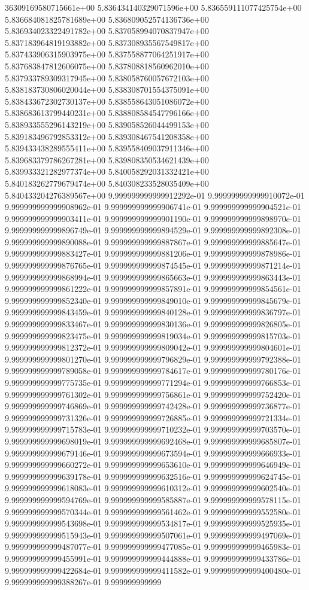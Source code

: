 36309169580715661e+00	5.836434140329071596e+00	5.836559111077425754e+00	5.836684081825781689e+00	5.836809052574136736e+00	5.836934023322491782e+00	5.837058994070837947e+00	5.837183964819193882e+00	5.837308935567549817e+00	5.837433906315903975e+00	5.837558877064251917e+00	5.837683847812606075e+00	5.837808818560962010e+00	5.837933789309317945e+00	5.838058760057672103e+00	5.838183730806020044e+00	5.838308701554375091e+00	5.838433672302730137e+00	5.838558643051086072e+00	5.838683613799440231e+00	5.838808584547796166e+00	5.838933555296143219e+00	5.839058526044499153e+00	5.839183496792853312e+00	5.839308467541208358e+00	5.839433438289555411e+00	5.839558409037911346e+00	5.839683379786267281e+00	5.839808350534621439e+00	5.839933321282977374e+00	5.840058292031332421e+00	5.840183262779679474e+00	5.840308233528035409e+00	5.840433204276389567e+00
9.999999999999912292e-01	9.999999999999910072e-01	9.999999999999908962e-01	9.999999999999906741e-01	9.999999999999904521e-01	9.999999999999903411e-01	9.999999999999901190e-01	9.999999999999898970e-01	9.999999999999896749e-01	9.999999999999894529e-01	9.999999999999892308e-01	9.999999999999890088e-01	9.999999999999887867e-01	9.999999999999885647e-01	9.999999999999883427e-01	9.999999999999881206e-01	9.999999999999878986e-01	9.999999999999876765e-01	9.999999999999874545e-01	9.999999999999871214e-01	9.999999999999868994e-01	9.999999999999865663e-01	9.999999999999863443e-01	9.999999999999861222e-01	9.999999999999857891e-01	9.999999999999854561e-01	9.999999999999852340e-01	9.999999999999849010e-01	9.999999999999845679e-01	9.999999999999843459e-01	9.999999999999840128e-01	9.999999999999836797e-01	9.999999999999833467e-01	9.999999999999830136e-01	9.999999999999826805e-01	9.999999999999823475e-01	9.999999999999819034e-01	9.999999999999815703e-01	9.999999999999812372e-01	9.999999999999809042e-01	9.999999999999804601e-01	9.999999999999801270e-01	9.999999999999796829e-01	9.999999999999792388e-01	9.999999999999789058e-01	9.999999999999784617e-01	9.999999999999780176e-01	9.999999999999775735e-01	9.999999999999771294e-01	9.999999999999766853e-01	9.999999999999761302e-01	9.999999999999756861e-01	9.999999999999752420e-01	9.999999999999746869e-01	9.999999999999742428e-01	9.999999999999736877e-01	9.999999999999731326e-01	9.999999999999726885e-01	9.999999999999721334e-01	9.999999999999715783e-01	9.999999999999710232e-01	9.999999999999703570e-01	9.999999999999698019e-01	9.999999999999692468e-01	9.999999999999685807e-01	9.999999999999679146e-01	9.999999999999673594e-01	9.999999999999666933e-01	9.999999999999660272e-01	9.999999999999653610e-01	9.999999999999646949e-01	9.999999999999639178e-01	9.999999999999632516e-01	9.999999999999624745e-01	9.999999999999618083e-01	9.999999999999610312e-01	9.999999999999602540e-01	9.999999999999594769e-01	9.999999999999585887e-01	9.999999999999578115e-01	9.999999999999570344e-01	9.999999999999561462e-01	9.999999999999552580e-01	9.999999999999543698e-01	9.999999999999534817e-01	9.999999999999525935e-01	9.999999999999515943e-01	9.999999999999507061e-01	9.999999999999497069e-01	9.999999999999487077e-01	9.999999999999477085e-01	9.999999999999465983e-01	9.999999999999455991e-01	9.999999999999444888e-01	9.999999999999433786e-01	9.999999999999422684e-01	9.999999999999411582e-01	9.999999999999400480e-01	9.999999999999388267e-01	9.999999999999